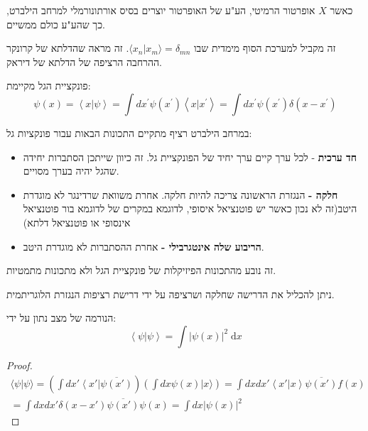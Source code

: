 \documentclass{tstextbook}
\begin{document}
\begin{proposition}
כאשר \(X\) אופרטור הרמיטי, הע"ע של האופרטור יוצרים בסיס אורתונורמלי למרחב הילברט, כך שהע"ע כולם ממשיים.

\end{proposition}
\begin{remark}
זה מקביל למערכת הסוף מימדית שבו \(\langle x_{n}|x_{m} \rangle=\delta_{mn}\). זה מראה שהדלתא של קרונקר ההרחבה הרציפה של הדלתא של דיראק.

\end{remark}
\begin{proposition}
פונקציית הגל מקיימת:
$$\psi\left(x\right)=\left\langle x|\psi\right\rangle=\int d x^{\prime}\psi\left(x^{\prime}\right)\left\langle x|x^{\prime}\right\rangle=\int d x^{\prime}\psi\left(x^{\prime}\right)\delta\left(x-x^{\prime}\right)$$

\end{proposition}
\begin{proposition}
במרחב הילברט רציף מתקיים התכונות הבאות עבור פונקציות גל:

  \begin{itemize}
    \item \textbf{חד ערכית} - לכל ערך קיים ערך יחיד של הפונקציית גל. זה כיוון שייתכן הסתברות יחידה שהגל יהיה בערך מסויים.
    \item \textbf{חלקה -} הנגזרת הראשונה צריכה להיות חלקה. אחרת משוואת שרדינגר לא מוגדרת היטב(זה לא נכון כאשר יש פוטנציאל איסופי, לדוגמא במקרים של לדוגמא בור פוטנציאל אינסופי או פוטנציאל דלתא)
    \item \textbf{הריבוע שלה אינטגרבילי -} אחרת ההסתברות לא מוגדרת היטב.
  \end{itemize}
זה נובע מהתכונות הפיזיקלות של פונקציית הגל ולא מתכונות מתמטיות.

\end{proposition}
\begin{corollary}
ניתן להכליל את הדרישה שחלקה ושרציפה על ידי דרישת רציפות הנגזרת הלוגריתמית.

\end{corollary}
\begin{proposition}
הנורמה של מצב נתון על ידי:
$$\left\langle  \psi|\psi  \right\rangle = \int  \left\lvert  \psi(x)  \right\rvert ^2 \; \mathrm{d}x$$

\end{proposition}
\begin{proof}
$$\begin{gather}\langle\psi|\psi\rangle=\left(\int dx'\left\langle x'\right|\overline{\psi\left(x'\right)}\right)\left(\int dx\psi\left(x\right)|x\rangle\right)=\int dxdx'\left\langle x'|x\right\rangle\overline{\psi\left(x'\right)}f\left(x\right)\\=\int dxdx'\delta\left(x-x'\right)\overline{\psi\left(x'\right)}\psi\left(x\right)=\int dx\left|\psi\left(x\right)\right|^{2} 
\end{gather}$$

\end{proof}
\end{document}
